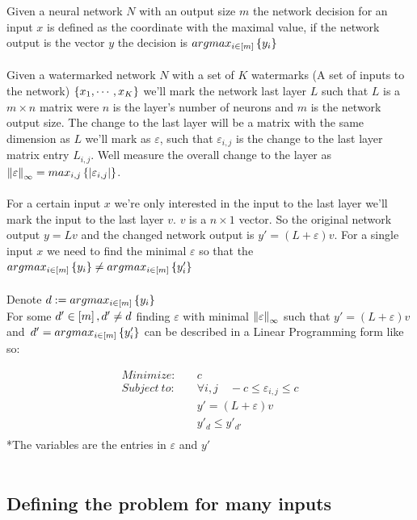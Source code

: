 \documentclass[a4paper]{llncs}
\begin{document}
Given a neural network $N$ with an output size $m$ the network
decision for an input $x$ is defined as the coordinate with the
maximal value, if the network output is the vector $y$ the decision is
$argmax_{i\in \left[m\right]} \left\lbrace y_i\right\rbrace$
\\\\
Given a watermarked network $N$ with a set of $K$ watermarks (A set of
inputs to the network) $\left\lbrace x_1,\cdots,x_K\right\rbrace$ we'll mark the
network last layer $L$ such that $L$ is a $m\times n$ matrix were $n$
is the layer's number of neurons and $m$ is the network output size.
The change to the last layer will be a matrix with the same dimension
as $L$ we'll mark as $\varepsilon$, such that $\varepsilon_{i,j}$ is
the change to the last layer matrix entry $L_{i,j}$. Well measure the
overall change to the layer as
$\left\lVert\varepsilon\right\rVert_{\infty} =
max_{i,j}\left\lbrace \left\lvert\varepsilon_{i,j}\right\rvert\right\rbrace$.
\\\\
For a certain input $x$ we're only interested in the input to the last
layer we'll mark the input to the last layer $v$. $v$ is a $n\times 1$
vector.  So the original network output $y = Lv$ and the changed
network output is $y' = (L+\varepsilon)v$. For a single input $x$ we
need to find the minimal $\varepsilon$ so that the
$argmax_{i\in\left[m\right]}\left\lbrace y_i\right\rbrace\neq
argmax_{i\in\left[m\right]}\left\lbrace y'_i\right\rbrace$
\\\\
Denote $d := argmax_{i\in \left[m\right]} \left\lbrace y_i\right\rbrace$ \\
For some $d'\in\left[m\right],d'\neq d$ finding $\varepsilon$ with
minimal $\left\lVert\varepsilon\right\rVert_{\infty}$ such that
$y' = (L+\varepsilon)v\,$ and
$\,d' = argmax_{i\in\left[m\right]}\left\lbrace y'_i\right\rbrace$ can be described
in a Linear Programming form like so:

\begin{align*}
    Minimize:\quad & c \\
    Subject\ to:\quad & \forall i,j\quad -c \leq\varepsilon_{i,j}\leq c\\
    & y'=(L+\varepsilon)v \\
    & y'_d \leq y'_{d'}\\
\end{align*}
\hspace*{5cm} *The variables are the entries in $\varepsilon$ and $y'$
\\\\

\subsection{Defining the problem for many inputs}
\label{sec:defineProblem2}
\end{document}
